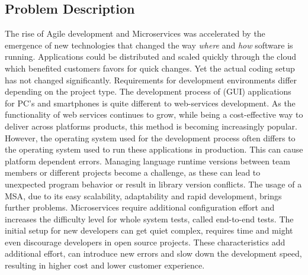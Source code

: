 \documentclass[12pt, a4paper]{article}
\begin{document}
    \subsection{Problem Description}
    The rise of Agile development and Microservices was accelerated by the emergence of new technologies that changed the way \textit{where} and \textit{how} software is running. Applications could be distributed and scaled quickly through the cloud which benefited customers favors for quick changes. Yet the actual coding setup has not changed significantly.\newline
    Requirements for development environments differ depending on the project type. The development process of (\ac{GUI}) applications for PC's and smartphones is quite different to web-services development. As the functionality of web services continues to grow, while being a cost-effective way to deliver across platforms products, this method is becoming increasingly popular. However, the operating system used for the development process often differs to the operating system used to run these applications in production. This can cause platform dependent errors. Managing language runtime versions between team members or different projects become a challenge, as these can lead to unexpected program behavior or result in library version conflicts. The usage of a \acl{MSA}, due to its easy scalability, adaptability and rapid development, brings further problems. Microservices require additional configuration effort and increases the difficulty level for whole system tests, called end-to-end tests. The initial setup for new developers can get quiet complex, requires time and might even discourage developers in open source projects.\newline
    These characteristics add additional effort, can introduce new errors and slow down the development speed, resulting in higher cost and lower customer experience.
\end{document}
